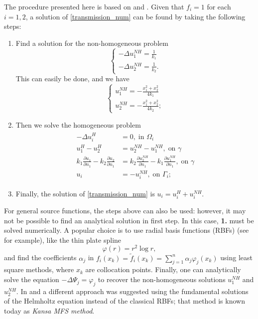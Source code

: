 The procedure presented here is based on \cite{alves2005new} and \cite{alves2021domain}. Given that \(f_i = 1\) for each \(i=1, 2\), a solution of \eqref{transmission_num} can be found by taking the following steps:
\begin{enumerate}
    \item Find a solution for the non-homogeneous problem
    \[
        \begin{cases}
            -\Delta u_1^{NH} = \frac{1}{k_1}\\
            -\Delta u_2^{NH} = \frac{1}{k_2}.
        \end{cases}
    \]
    This can easily be done, and we have
    \[
        \begin{cases}
            u_1^{NH} = -\frac{x_1^2 + x_2^2}{4k_1}\\
            u_2^{NH} = -\frac{x_1^2 + x_2^2}{4k_2};
        \end{cases}
    \]
    \item Then we solve the homogeneous problem
    \begin{align}\label{transmission_num_homo}
        \begin{split}
        - \Delta u_i^H &= 0, \; \text{in }\Omega_i\\
        u_1^H - u_2^H &= u_2^{NH}- u_1^{NH}, \; \text{on }\gamma\\
        k_1 \frac{\partial u_1}{\partial n_1} - k_2 \frac{\partial u_2}{\partial n_1} &= k_2 \frac{\partial u_2^{NH}}{\partial n_1}  - k_1 \frac{\partial u_1^{NH}}{\partial n_1}, \; \text{on }\gamma\\
        u_i &= - u_i^{NH}, \; \text{on }\Gamma_i;
        \end{split}
    \end{align}
    \item Finally, the solution of \eqref{transmission_num} is \(u_i = u_i^H + u_i^{NH}\).
\end{enumerate}
For general source functions, the steps above can also be used: however, it may not be possible to find an analytical solution in first step. In this case, \textbf{1.} must be solved numerically. A popular choice is to use radial basis functions (\ac{RBF}s) (see \cite{golberg1996improved} for example), like the thin plate spline
\[
    \varphi(r) = r^2 \log r,     
\]
and find the coefficients \(\alpha_j\) in \(f_i(x_k) = \tilde{f}_i(x_k) = \sum_{j=1}^{n} \alpha_j \varphi_j(x_k)\) using least square methods, where \(x_k\) are collocation points. Finally, one can analytically solve the equation \(-\Delta \Psi_j = \varphi_j\) to recover the non-homogeneous solutions \(u_1^{NH}\) and \(u_2^{NH}\). In \cite{alves2005new} and \cite{alves2021domain} a different approach was suggested using the fundamental solutions of the Helmholtz equation instead of the classical \ac{RBF}s; that method is known today as \textit{Kansa MFS method}.

